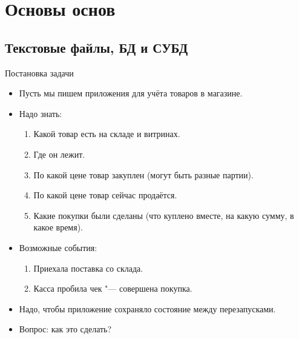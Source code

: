 \section{Основы основ}
\subsection{Текстовые файлы, БД и СУБД}

\begin{frame}
\end{frame}

\begin{frame}{Постановка задачи}
	\begin{itemize}
		\item Пусть мы пишем приложения для учёта товаров в магазине.
		\item Надо знать:
			\begin{enumerate}
				\item Какой товар есть на складе и витринах.
				\item Где он лежит.
				\item По какой цене товар закуплен (могут быть разные партии).
				\item По какой цене товар сейчас продаётся.
				\item Какие покупки были сделаны (что куплено вместе, на какую сумму, в какое время).
			\end{enumerate}
		\item Возможные события:
			\begin{enumerate}
				\item Приехала поставка со склада.
				\item Касса пробила чек "--- совершена покупка.
			\end{enumerate}
		\item Надо, чтобы приложение сохраняло состояние между перезапусками.
		\item Вопрос: как это сделать?
	\end{itemize}
\end{frame}

